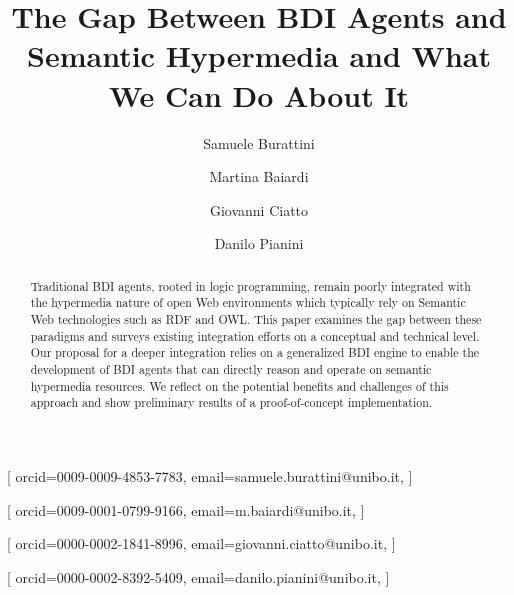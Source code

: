 \documentclass[
]{ceurart}
\begin{document}


\title{The Gap Between BDI Agents and Semantic Hypermedia and What We Can Do About It}


\author[1]{Samuele Burattini}[%
orcid=0009-0009-4853-7783,
email=samuele.burattini@unibo.it,
]
\cormark[1]
\fnmark[1]

\author[1]{Martina Baiardi}[%
orcid=0009-0001-0799-9166,
email=m.baiardi@unibo.it,
]
\fnmark[1]

\author[1]{Giovanni Ciatto}[%
orcid=0000-0002-1841-8996,
email=giovanni.ciatto@unibo.it,
]


\author[1]{Danilo Pianini}[%
orcid=0000-0002-8392-5409,
email=danilo.pianini@unibo.it,
]



\address[1]{\disi, \unibo}



\begin{abstract}
  Traditional BDI agents, 
  rooted in logic programming, 
  remain poorly integrated with the hypermedia nature of open Web environments
  which typically rely on Semantic Web technologies such as RDF and OWL.
  This paper examines the gap between these paradigms and surveys existing integration efforts on a conceptual and technical level.
  Our proposal for a deeper integration relies on a generalized BDI engine to enable the development of BDI agents that can directly reason and operate on semantic hypermedia resources.
  We reflect on the potential benefits and challenges of this approach and show preliminary results of a proof-of-concept implementation.
\end{abstract}
\end{document}
